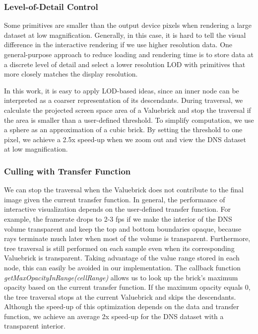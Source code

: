 \subsubsection{Level-of-Detail Control}
Some primitives are smaller than the output device pixels when rendering a
large dataset at low magnification\cite{rusinkiewicz2000qsplat}. Generally, in this case,
it is hard to tell the visual difference in the interactive rendering if we use higher
resolution data. 
One general-purpose approach to reduce loading and rendering time is to store data at a discrete
level of detail and select a lower resolution LOD with primitives that more closely matches the
display resolution. 

In this work, it is easy to apply LOD-based ideas, since an inner node can be interpreted as
a coarser representation of its descendants. During traversal, we calculate the projected
screen space area of a Valuebrick and stop the traversal if the area is smaller than a 
user-defined threshold. To simplify computation, we use a sphere as an approximation of a cubic
brick. By setting the threshold to one pixel, we achieve a 2.5x speed-up when we 
zoom out and view the DNS dataset at low magnification. 


\subsubsection{Culling with Transfer Function}
We can stop the traversal when the Valuebrick does not contribute to the 
final image given the current transfer function. In general, the performance of interactive visualization
depends on the user-defined transfer function.
For example, the framerate drops to 2-3 fps if we make the interior of the DNS volume transparent and keep the
top and bottom boundaries opaque, because rays terminate much later
when most of the volume is transparent. Furthermore, tree traversal is still performed on each
sample even when its corresponding Valuebrick is transparent. Taking advantage of the value
range stored in each node, this can easily be avoided in our implementation. The callback
function \textit{getMaxOpacityInRange(cellRange)} allows us to look up the brick's maximum
opacity based on the current transfer function.
If the maximum opacity equals 0, the tree traversal stops at the 
current Valuebrick and skips the descendants. Although the speed-up of this optimization
depends on the data and transfer function, we achieve an average 2x speed-up for
the DNS dataset with a transparent interior.



